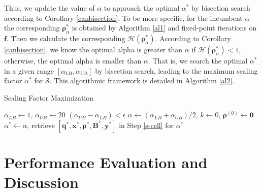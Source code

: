 \documentclass[10pt,journal,final,finalsubmission,twocolumn]{IEEEtran}
\begin{document}
Thus, we update the value of $\alpha$ to approach the optimal $\alpha^*$ by bisection search according to Corollary \ref{canbisection}. To be more specific, for the incumbent $\alpha$ the corresponding $\boldsymbol{\rho}^*_\alpha$ is obtained by Algorithm \ref{al1} and fixed-point iterations on $\boldsymbol{f}$. Then we calculate the corresponding $\mathcal{H}(\boldsymbol{\rho}^*_\alpha)$. According to Corollary \ref{canbisection}, we know the optimal alpha is greater than $\alpha$ if  $\mathcal{H}(\boldsymbol{\rho}^*_\alpha)<1$, otherwise, the optimal alpha is smaller than $\alpha$. That is, we search the optimal $\alpha ^*$ in a given range $[\alpha _\text{LB},\alpha _\text{UB} ]$ by bisection search, leading to the maximum scaling factor $\alpha^*$ for $\mathcal{S}$. This algorithmic framework is detailed in Algorithm \ref{al2}. 

\begin{algorithm}[tbp]\label{al2}
\caption{Scaling Factor Maximization} 
$\alpha_{LB}\leftarrow 1$, $\alpha_{UB}\leftarrow 20$\;
\Repeat 
{$(\alpha _{UB}- \alpha_{LB})<\epsilon$}
{$\alpha \leftarrow (\alpha_{LB}+\alpha_{UB})/{2}$, $k\leftarrow0$, $\boldsymbol{\rho}^{(0)}\leftarrow \boldsymbol{0}$\;
}  
$\alpha^*\leftarrow \alpha$, retrieve $[\boldsymbol{q}^*,\boldsymbol{x}^*,\boldsymbol{\rho}^*, \boldsymbol{B}^*,\boldsymbol{y}^*]$ in Step \ref{s-cell} for $\alpha^*$\;
\;
\end{algorithm} 



\section{Performance Evaluation and Discussion}\label{Sec:PerformanceEvaluationDiscussions}
\end{document}
